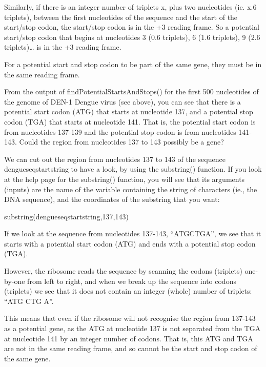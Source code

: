 \documentclass[
]{book}
\newenvironment{Shaded}{\begin{snugshade}}{\end{snugshade}}
\newcommand{\DecValTok}[1]{\textcolor[rgb]{0.00,0.00,0.81}{#1}}
\newcommand{\FunctionTok}[1]{\textcolor[rgb]{0.00,0.00,0.00}{#1}}
\newcommand{\NormalTok}[1]{#1}
\begin{document}
Similarly, if there is an integer number of triplets x, plus two nucleotides (ie. x.6 triplets), between the first nucleotides of the sequence and the start of the start/stop codon, the start/stop codon is in the +3 reading frame. So a potential start/stop codon that begins at nucleotides 3 (0.6 triplets), 6 (1.6 triplets), 9 (2.6 triplets)\ldots{} is in the +3 reading frame.

For a potential start and stop codon to be part of the same gene, they must be in the same reading frame.

From the output of findPotentialStartsAndStops() for the first 500 nucleotides of the genome of DEN-1 Dengue virus (see above), you can see that there is a potential start codon (ATG) that starts at nucleotide 137, and a potential stop codon (TGA) that starts at nucleotide 141. That is, the potential start codon is from nucleotides 137-139 and the potential stop codon is from nucleotides 141-143. Could the region from nucleotides 137 to 143 possibly be a gene?

We can cut out the region from nucleotides 137 to 143 of the sequence dengueseqstartstring to have a look, by using the substring() function. If you look at the help page for the substring() function, you will see that its arguments (inputs) are the name of the variable containing the string of characters (ie., the DNA sequence), and the coordinates of the substring that you want:

\begin{Shaded}
\begin{Highlighting}[]
\FunctionTok{substring}\NormalTok{(dengueseqstartstring,}\DecValTok{137}\NormalTok{,}\DecValTok{143}\NormalTok{)}
\end{Highlighting}
\end{Shaded}

If we look at the sequence from nucleotides 137-143, ``ATGCTGA'', we see that it starts with a potential start codon (ATG) and ends with a potential stop codon (TGA).

However, the ribosome reads the sequence by scanning the codons (triplets) one-by-one from left to right, and when we break up the sequence into codons (triplets) we see that it does not contain an integer (whole) number of triplets: ``ATG CTG A''.

This means that even if the ribosome will not recognise the region from 137-143 as a potential gene, as the ATG at nucleotide 137 is not separated from the TGA at nucleotide 141 by an integer number of codons. That is, this ATG and TGA are not in the same reading frame, and so cannot be the start and stop codon of the same gene.
\end{document}
